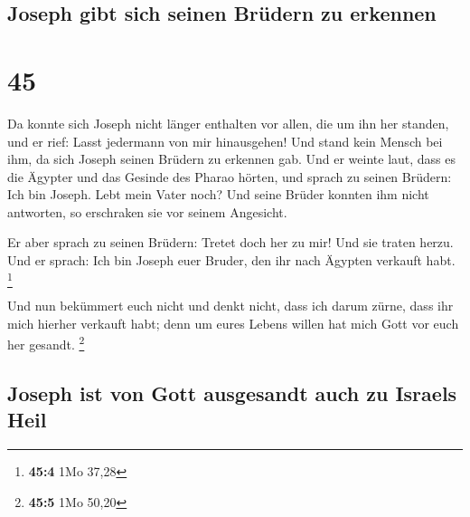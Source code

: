 \hypertarget{joseph-gibt-sich-seinen-bruxfcdern-zu-erkennen}{%
\subsection{Joseph gibt sich seinen Brüdern zu
erkennen}\label{joseph-gibt-sich-seinen-bruxfcdern-zu-erkennen}}

\hypertarget{section-44}{%
\section{45}\label{section-44}}

 Da konnte sich Joseph nicht länger enthalten vor allen,
die um ihn her standen, und er rief: Lasst jedermann von mir
hinausgehen! Und stand kein Mensch bei ihm, da sich Joseph seinen
Brüdern zu erkennen gab.  Und er weinte laut, dass es die
Ägypter und das Gesinde des Pharao hörten,  und sprach zu
seinen Brüdern: Ich bin Joseph. Lebt mein Vater noch? Und seine Brüder
konnten ihm nicht antworten, so erschraken sie vor seinem Angesicht.

 Er aber sprach zu seinen Brüdern: Tretet doch her zu mir!
Und sie traten herzu. Und er sprach: Ich bin Joseph euer Bruder, den ihr
nach Ägypten verkauft habt. \footnote{\textbf{45:4} 1Mo 37,28}

 Und nun bekümmert euch nicht und denkt nicht, dass ich
darum zürne, dass ihr mich hierher verkauft habt; denn um eures Lebens
willen hat mich Gott vor euch her gesandt. \footnote{\textbf{45:5} 1Mo
  50,20}

\hypertarget{joseph-ist-von-gott-ausgesandt-auch-zu-israels-heil}{%
\subsection{Joseph ist von Gott ausgesandt auch zu Israels
Heil}\label{joseph-ist-von-gott-ausgesandt-auch-zu-israels-heil}}

